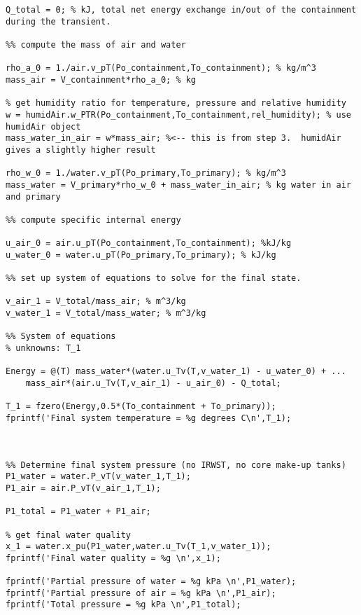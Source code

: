 \begin{fullwidth}
\begin{lstlisting}
Q_total = 0; % kJ, total net energy exchange in/out of the containment during the transient.

%% compute the mass of air and water

rho_a_0 = 1./air.v_pT(Po_containment,To_containment); % kg/m^3
mass_air = V_containment*rho_a_0; % kg

% get humidity ratio for temperature, pressure and relative humidity
w = humidAir.w_PTR(Po_containment,To_containment,rel_humidity); % use humidAir object
mass_water_in_air = w*mass_air; %<-- this is from step 3.  humidAir gives a slightly higher result

rho_w_0 = 1./water.v_pT(Po_primary,To_primary); % kg/m^3
mass_water = V_primary*rho_w_0 + mass_water_in_air; % kg water in air and primary  

%% compute specific internal energy

u_air_0 = air.u_pT(Po_containment,To_containment); %kJ/kg
u_water_0 = water.u_pT(Po_primary,To_primary); % kJ/kg

%% set up system of equations to solve for the final state.

v_air_1 = V_total/mass_air; % m^3/kg 
v_water_1 = V_total/mass_water; % m^3/kg

%% System of equations
% unknowns: T_1

Energy = @(T) mass_water*(water.u_Tv(T,v_water_1) - u_water_0) + ...
    mass_air*(air.u_Tv(T,v_air_1) - u_air_0) - Q_total;

T_1 = fzero(Energy,0.5*(To_containment + To_primary));
fprintf('Final system temperature = %g degrees C\n',T_1);



%% Determine final system pressure (no IRWST, no core make-up tanks)
P1_water = water.P_vT(v_water_1,T_1);
P1_air = air.P_vT(v_air_1,T_1);

P1_total = P1_water + P1_air;

% get final water quality
x_1 = water.x_pu(P1_water,water.u_Tv(T_1,v_water_1));
fprintf('Final water quality = %g \n',x_1);

fprintf('Partial pressure of water = %g kPa \n',P1_water);
fprintf('Partial pressure of air = %g kPa \n',P1_air);
fprintf('Total pressure = %g kPa \n',P1_total);


\end{lstlisting}

\end{fullwidth}

